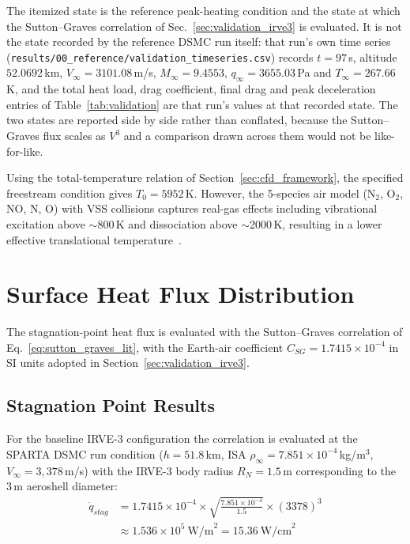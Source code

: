 The itemized state is the reference peak-heating condition and the state at which the Sutton--Graves correlation of Sec.~\ref{sec:validation_irve3} is evaluated. It is not the state recorded by the reference DSMC run itself: that run's own time series (\texttt{results/00\_reference/validation\_timeseries.csv}) records $t = 97$\,s, altitude $52.0692$\,km, $V_{\infty} = 3101.08$\,m/s, $M_{\infty} = 9.4553$, $q_{\infty} = 3655.03$\,Pa and $T_{\infty} = 267.66$\,K, and the total heat load, drag coefficient, final drag and peak deceleration entries of Table~\ref{tab:validation} are that run's values at that recorded state. The two states are reported side by side rather than conflated, because the Sutton--Graves flux scales as $V^3$ and a comparison drawn across them would not be like-for-like.

Using the total-temperature relation of Section~\ref{sec:cfd_framework}, the specified freestream condition gives $T_0 = 5952$\,K.
However, the 5-species air model (N$_2$, O$_2$, NO, N, O) with VSS collisions captures real-gas effects including vibrational excitation above $\sim$800\,K and dissociation above $\sim$2000\,K, resulting in a lower effective translational temperature~\cite{bird1994molecular}.

\section{Surface Heat Flux Distribution}
The stagnation-point heat flux is evaluated with the Sutton--Graves correlation of Eq.~\eqref{eq:sutton_graves_lit}, with the Earth-air coefficient $C_{SG} = 1.7415 \times 10^{-4}$ in SI units adopted in Section~\ref{sec:validation_irve3}.

\subsection{Stagnation Point Results}
For the baseline IRVE-3 configuration the correlation is evaluated at the SPARTA DSMC run condition ($h = 51.8$\,km, ISA $\rho_{\infty} = 7.851 \times 10^{-4}$\,kg/m$^3$, $V_{\infty} = 3{,}378$\,m/s) with the IRVE-3 body radius $R_N = 1.5$\,m corresponding to the 3\,m aeroshell diameter:
\begin{equation}
    \begin{split}
        \dot{q}_{stag} &= 1.7415 \times 10^{-4} \times \sqrt{\frac{7.851 \times 10^{-4}}{1.5}} \times (3378)^3 \\
        &\approx 1.536 \times 10^{5} \ \text{W/m}^2 = 15.36 \ \text{W/cm}^2
    \end{split}
\end{equation}

